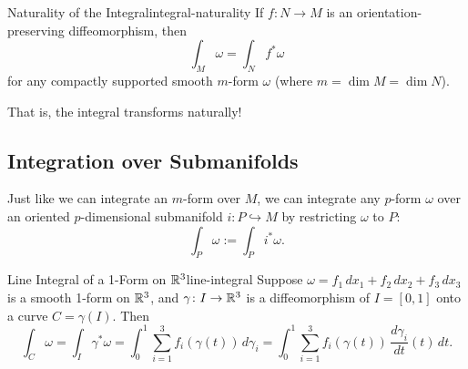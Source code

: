\begin{theorem}{Naturality of the Integral}{integral-naturality}
    If $f \colon N \to M$ is an orientation-preserving diffeomorphism, then
    \[
        \int_M \omega = \int_N f^*\omega
    \]
    for any compactly supported smooth $m$-form $\omega$ (where $m = \dim M = \dim N$).
\end{theorem}

That is, the integral transforms naturally!

\subsection{Integration over Submanifolds}

Just like we can integrate an $m$-form over $M$, we can integrate any $p$-form $\omega$ over an oriented $p$-dimensional submanifold $i \colon P \hookrightarrow M$ by restricting $\omega$ to $P$:
\[
    \int_P \omega := \int_P i^*\omega.
\]

\begin{example}{Line Integral of a 1-Form on $\mathbb{R}^3$}{line-integral}
    Suppose $\omega = f_1\, dx_1 + f_2\, dx_2 + f_3\, dx_3$ is a smooth 1-form on $\mathbb{R}^3$, and $\gamma \colon I \to \mathbb{R}^3$ is a diffeomorphism of $I = [0,1]$ onto a curve $C = \gamma(I)$. Then
    \[
        \int_C \omega = \int_I \gamma^* \omega = \int_0^1 \sum_{i=1}^{3} f_i(\gamma(t))\, d\gamma_i = \int_0^1 \sum_{i=1}^{3} f_i(\gamma(t))\, \frac{d\gamma_i}{dt}(t)\, dt.
    \]
\end{example}

